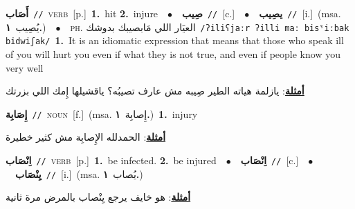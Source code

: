 \documentclass[10pt,a4paper,twoside]{article} %
\begin{document}
\begin{multicols}{2}
{\setlength\topsep{0pt}\textbf{\foreignlanguage{arabic}{أَصَاب}}\ {\color{gray}\texttt{//}\color{black}}\ \textsc{verb}\ [p.]\ \textbf{1.}~hit  \textbf{2.}~injure\ \ $\bullet$\ \ \setlength\topsep{0pt}\textbf{\foreignlanguage{arabic}{صِيب}}\ {\color{gray}\texttt{//}\color{black}}\ [c.]\ \ $\bullet$\ \ \setlength\topsep{0pt}\textbf{\foreignlanguage{arabic}{يصِيب}}\ {\color{gray}\texttt{//}\color{black}}\ [i.]\ \color{gray}(msa. \foreignlanguage{arabic}{يُصِيب}~\foreignlanguage{arabic}{\textbf{١.}})\color{black}\ \ $\bullet$\ \ \textsc{ph.} \color{gray} \foreignlanguage{arabic}{العيَار اللي مَابصيبك بدوشك}\color{black}\ {\color{gray}\texttt{/{\sffamily ʔiliʕjaːr ʔilli maː bisˤiːbak bidwiʃak}/}\color{black}}\ \textbf{1.}~It is an idiomatic expression that means that those who speak ill of you will hurt you even if what they is not true, and even if people know you very well\  \begin{flushright}\color{gray}\foreignlanguage{arabic}{\textbf{\underline{\foreignlanguage{arabic}{أمثلة}}}: يازلمة هياته الطير صِيبه مش عارف تصيبُه؟ ياقشيلها إِمك اللي بزرتك}\end{flushright}\color{black}} \vspace{2mm}

{\setlength\topsep{0pt}\textbf{\foreignlanguage{arabic}{إِصَابِة}}\ {\color{gray}\texttt{//}\color{black}}\ \textsc{noun}\ [f.]\ \color{gray}(msa. \foreignlanguage{arabic}{إِصابِة}~\foreignlanguage{arabic}{\textbf{١.}})\color{black}\ \textbf{1.}~injury\  \begin{flushright}\color{gray}\foreignlanguage{arabic}{\textbf{\underline{\foreignlanguage{arabic}{أمثلة}}}: الحمدلله الإِصابِة مش كثير خطيرة}\end{flushright}\color{black}} \vspace{2mm}

{\setlength\topsep{0pt}\textbf{\foreignlanguage{arabic}{اِنْصَاب}}\ {\color{gray}\texttt{//}\color{black}}\ \textsc{verb}\ [p.]\ \textbf{1.}~be infected.  \textbf{2.}~be injured\ \ $\bullet$\ \ \setlength\topsep{0pt}\textbf{\foreignlanguage{arabic}{اِنْصَاب}}\ {\color{gray}\texttt{//}\color{black}}\ [c.]\ \ $\bullet$\ \ \setlength\topsep{0pt}\textbf{\foreignlanguage{arabic}{يِنْصَاب}}\ {\color{gray}\texttt{//}\color{black}}\ [i.]\ \color{gray}(msa. \foreignlanguage{arabic}{يُصاب}~\foreignlanguage{arabic}{\textbf{١.}})\color{black}\  \begin{flushright}\color{gray}\foreignlanguage{arabic}{\textbf{\underline{\foreignlanguage{arabic}{أمثلة}}}: هو خايف يرجع يِنْصاب بالمرض مرة ثانية}\end{flushright}\color{black}} \vspace{2mm}


\end{multicols}
\end{document}
